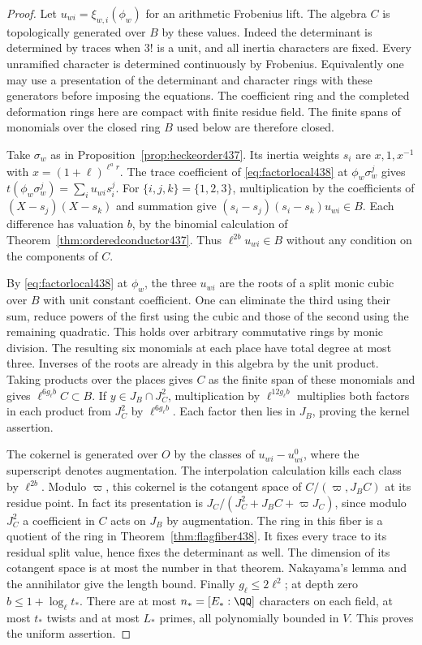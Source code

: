 \documentclass[a4paper,11pt]{article}
\theoremstyle{definition}
\theoremstyle{remark}
\numberwithin{equation}{section}
\begin{document}
\begin{proof}
Let \(u_{wi}=\xi_{w,i}(\phi_w)\) for an arithmetic Frobenius
lift. The algebra \(C\) is topologically generated over \(B\)
by these values. Indeed the determinant is determined by
traces when \(3!\) is a unit, and all inertia characters are
fixed. Every unramified character is determined continuously
by Frobenius. Equivalently one may use a presentation of the
determinant and character rings with these generators before
imposing the equations. The coefficient ring and the completed
deformation rings here are compact with finite residue field.
The finite spans of monomials over the closed ring \(B\)
used below are therefore closed.

Take \(\sigma_w\) as in
Proposition~\ref{prop:heckeorder437}. Its inertia weights
\(s_i\) are \(x,1,x^{-1}\) with \(x=(1+\ell)^{\ell^a r}\).
The trace coefficient of \eqref{eq:factorlocal438} at
\(\phi_w\sigma_w^j\) gives
\(t(\phi_w\sigma_w^j)=\sum_i u_{wi}s_i^j\).
For \(\{i,j,k\}=\{1,2,3\}\), multiplication by the
coefficients of \((X-s_j)(X-s_k)\) and summation give
\((s_i-s_j)(s_i-s_k)u_{wi}\in B\).
Each difference has valuation \(b\), by the binomial
calculation of Theorem~\ref{thm:orderedconductor437}.
Thus \(\ell^{2b}u_{wi}\in B\) without any condition on
the components of \(C\).

By \eqref{eq:factorlocal438} at \(\phi_w\), the three \(u_{wi}\)
are the roots of a split monic cubic over \(B\) with unit
constant coefficient. One can eliminate the third using
their sum, reduce powers of the first using the cubic
and those of the second using the remaining quadratic.
This holds over arbitrary commutative rings by monic
division. The resulting six monomials at each place have
total degree at most three. Inverses of the roots are
already in this algebra by the unit product. Taking products
over the places gives \(C\) as the finite span of these
monomials and gives \(\ell^{6g_\ell b}C\subset B\).
If \(y\in J_B\cap J_C^2\), multiplication by
\(\ell^{12g_\ell b}\) multiplies both factors in each product
from \(J_C^2\) by \(\ell^{6g_\ell b}\). Each factor then lies
in \(J_B\), proving the kernel assertion.

The cokernel is generated over \(O\) by the classes of
\(u_{wi}-u_{wi}^{0}\), where the superscript denotes
augmentation. The interpolation calculation kills each
class by \(\ell^{2b}\). Modulo \(\varpi\), this cokernel
is the cotangent space of \(C/(\varpi,J_B C)\) at its
residue point. In fact its presentation is
\(J_C/(J_C^2+J_B C+\varpi J_C)\), since modulo \(J_C^2\)
a coefficient in \(C\) acts on \(J_B\) by augmentation.
The ring in this fiber is a quotient of the ring in
Theorem~\ref{thm:flagfiber438}. It fixes every trace
to its residual split value, hence fixes the determinant
as well. The dimension of its cotangent space is at most
the number in that theorem. Nakayama's lemma and the
annihilator give the length bound. Finally \(g_\ell\le2\ell^2\);
at depth zero \(b\le1+\log_\ell t_*\). There are at most
\(n_*=[E_*:\QQ]\) characters on each field, at most \(t_*\)
twists and at most \(L_*\) primes, all polynomially bounded
in \(V\). This proves the uniform assertion.
\end{proof}
\end{document}
